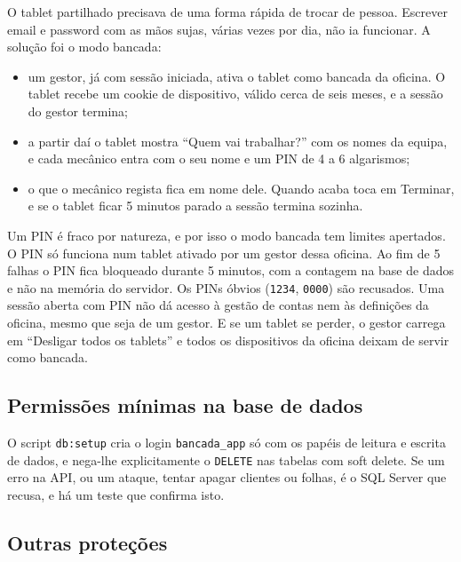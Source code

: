 \documentclass[a4paper,12pt]{article}
\begin{document}
O tablet partilhado precisava de uma forma rápida de trocar de pessoa. Escrever email e password com as mãos sujas, várias vezes por dia, não ia funcionar. A solução foi o modo bancada:
\begin{itemize}
    \item um gestor, já com sessão iniciada, ativa o tablet como bancada da oficina. O tablet recebe um cookie de dispositivo, válido cerca de seis meses, e a sessão do gestor termina;
    \item a partir daí o tablet mostra ``Quem vai trabalhar?'' com os nomes da equipa, e cada mecânico entra com o seu nome e um PIN de 4 a 6 algarismos;
    \item o que o mecânico regista fica em nome dele. Quando acaba toca em Terminar, e se o tablet ficar 5 minutos parado a sessão termina sozinha.
\end{itemize}

Um PIN é fraco por natureza, e por isso o modo bancada tem limites apertados. O PIN só funciona num tablet ativado por um gestor dessa oficina. Ao fim de 5 falhas o PIN fica bloqueado durante 5 minutos, com a contagem na base de dados e não na memória do servidor. Os PINs óbvios (\texttt{1234}, \texttt{0000}) são recusados. Uma sessão aberta com PIN não dá acesso à gestão de contas nem às definições da oficina, mesmo que seja de um gestor. E se um tablet se perder, o gestor carrega em ``Desligar todos os tablets'' e todos os dispositivos da oficina deixam de servir como bancada.

\subsection{Permissões mínimas na base de dados}

O script \texttt{db:setup} cria o login \texttt{bancada\_app} só com os papéis de leitura e escrita de dados, e nega-lhe explicitamente o \texttt{DELETE} nas tabelas com soft delete. Se um erro na \ac{API}, ou um ataque, tentar apagar clientes ou folhas, é o SQL Server que recusa, e há um teste que confirma isto.

\subsection{Outras proteções}
\end{document}
